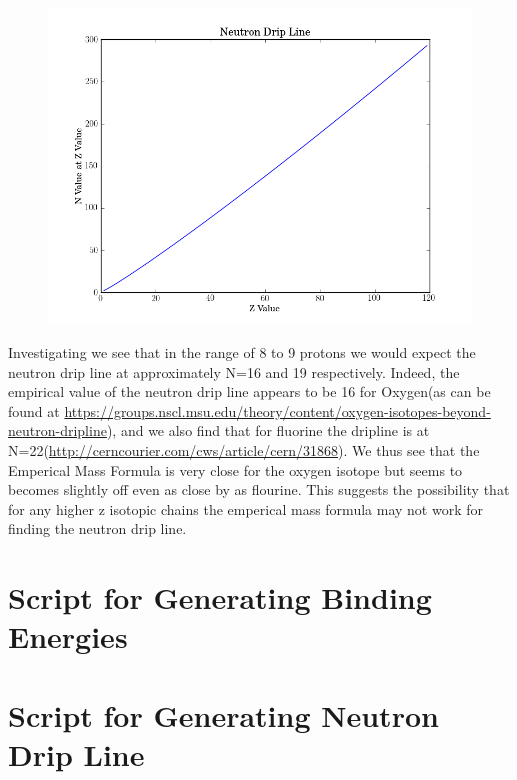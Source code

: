 \documentclass[11pt]{article} %
\begin{document}
\vspace{1mm}
\begin{figure}[h]
\centering
\includegraphics[width=\linewidth]{"NeutronDripLine"}
\end{figure}
\vspace{1mm}


Investigating we see that in the range of 8 to 9 protons we would expect the neutron drip line at approximately N=16 and 19 respectively. Indeed, the empirical value of the neutron drip line appears to be 16 for Oxygen(as can be found at \url{https://groups.nscl.msu.edu/theory/content/oxygen-isotopes-beyond-neutron-dripline}), and we also find that for fluorine the dripline is at N=22(\url{http://cerncourier.com/cws/article/cern/31868}). We thus see that the Emperical Mass Formula is very close for the oxygen isotope but seems to becomes slightly off even as close by as flourine. This suggests the possibility that for any higher z isotopic chains the emperical mass formula may not work for finding the neutron drip line.
\newpage
\section{Script for Generating Binding Energies}


\newpage
\section{Script for Generating Neutron Drip Line}

\end{document}
